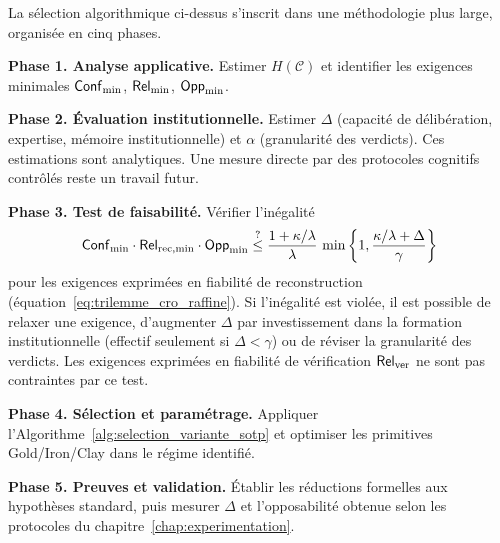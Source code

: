 \begin{sloppypar}
La s\'election algorithmique ci-dessus s'inscrit dans une m\'ethodologie plus large, organis\'ee en cinq phases.

\textbf{Phase 1. Analyse applicative.} Estimer $H(\mathcal{C})$ et identifier les
exigences minimales $\mathsf{Conf}_{\min}$, $\mathsf{Rel}_{\min}$, $\mathsf{Opp}_{\min}$.

\textbf{Phase 2. \'Evaluation institutionnelle.} Estimer $\Delta$ (capacit\'e de
d\'elib\'eration, expertise, m\'emoire institutionnelle) et $\alpha$ (granularit\'e des verdicts).
Ces estimations sont analytiques. Une mesure directe par des protocoles cognitifs contr\^ol\'es
reste un travail futur.

\textbf{Phase 3. Test de faisabilit\'e.} V\'erifier l'in\'egalit\'e
\begin{equation}
\mathsf{Conf}_{\min} \cdot \mathsf{Rel}_{\mathrm{rec},\min} \cdot \mathsf{Opp}_{\min} \stackrel{?}{\leq}
\frac{1+\kappa/\lambda}{\lambda}\,\min\left\{1, \frac{\kappa/\lambda + \Delta}{\gamma}\right\}
\label{eq:test_faisabilite_sotp}
\end{equation}
pour les exigences exprim\'ees en fiabilit\'e de reconstruction
(\'equation~\eqref{eq:trilemme_cro_raffine}). Si l'in\'egalit\'e est viol\'ee, il est possible de
relaxer une exigence, d'augmenter $\Delta$ par investissement dans la
formation institutionnelle (effectif seulement si $\Delta < \gamma$) ou de r\'eviser la
granularit\'e des verdicts. Les exigences exprim\'ees en fiabilit\'e de v\'erification
$\mathsf{Rel}_{\mathrm{ver}}$ ne sont pas contraintes par ce test.

\textbf{Phase 4. S\'election et param\'etrage.} Appliquer l'Algorithme~\ref{alg:selection_variante_sotp}
et optimiser les primitives Gold/Iron/Clay dans le r\'egime identifi\'e.

\textbf{Phase 5. Preuves et validation.} \'Etablir les r\'eductions formelles aux
hypoth\`eses standard, puis mesurer $\Delta$ et l'opposabilit\'e obtenue selon les
protocoles du chapitre~\ref{chap:experimentation}.
\end{sloppypar}

